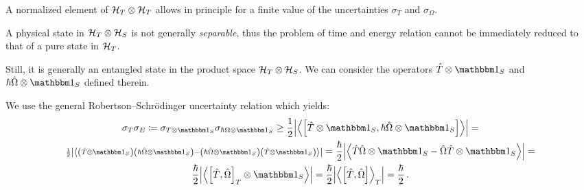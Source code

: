 A normalized element of $\mathcal{H}_T \otimes \mathcal{H}_T$ allows in principle for a finite value
of the uncertainties $\sigma_{T}$ and $\sigma_{\Omega}$.

A physical state in $\mathcal{H}_T \otimes \mathcal{H}_S$ is not generally
\emph{separable},
thus
the problem of time and energy relation cannot be immediately reduced to that of
a pure state in $\mathcal{H}_T$.

Still, it is generally an entangled state in the product space $\mathcal{H}_T \otimes \mathcal{H}_S$.
We can consider the
operators $\op{T} \ox \idop_{S}$ and $\hbar\op{\Omega} \ox \idop_{S}$
defined therein.

We use the general Robertson--Schr\"{o}dinger uncertainty relation which yields:
\begin{multline}
  \sigma_T \sigma_E \eqbydef
  \sigma_{T \ox \idop_S} \sigma_{\hbar\Omega \ox \idop_S} \geq
  \frac{1}{2} \abs{\expval{\comm
    {\op{T}\ox\idop_S} {\hbar\op{\Omega}\ox\idop_S}
  }} =
  \\
  {\scriptstyle
    \frac{1}{2} \abs{\expval{
      \qty(\op{T}\ox\idop_S) \qty(\hbar\op{\Omega}\ox\idop_S) -
      \qty(\hbar\op{\Omega}\ox\idop_S) \qty(\op{T}\ox\idop_S)
    }}
  } =
  \frac{\hbar}{2} \abs{\expval{
    \op{T}\op{\Omega}\ox\idop_S - \op{\Omega}\op{T}\ox\idop_S
  }} = \\
  \frac{\hbar}{2} \abs{\expval{
    \comm{\op{T}}{\op{\Omega}}_T \ox \idop_S
  }} =
  \frac{\hbar}{2} \abs{\expval{\comm
    {\op{T}}{\op{\Omega}}
  }_T} =
  \frac{\hbar}{2}
  \,\text{.}
\end{multline}





